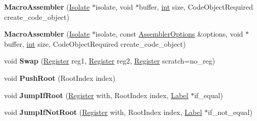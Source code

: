 \begin{DoxyCompactItemize}
\item 
\mbox{\label{classv8_1_1internal_1_1MacroAssembler_ace8e2b09ca4bac1b40d12d84416284f9}} 
{\bfseries Macro\+Assembler} (\mbox{\hyperlink{classv8_1_1internal_1_1Isolate}{Isolate}} $\ast$isolate, void $\ast$buffer, \mbox{\hyperlink{classint}{int}} size, Code\+Object\+Required create\+\_\+code\+\_\+object)
\item 
\mbox{\label{classv8_1_1internal_1_1MacroAssembler_a118ab3d38490e9a50ee0157274ac3dc9}} 
{\bfseries Macro\+Assembler} (\mbox{\hyperlink{classv8_1_1internal_1_1Isolate}{Isolate}} $\ast$isolate, const \mbox{\hyperlink{structv8_1_1internal_1_1AssemblerOptions}{Assembler\+Options}} \&options, void $\ast$buffer, \mbox{\hyperlink{classint}{int}} size, Code\+Object\+Required create\+\_\+code\+\_\+object)
\item 
\mbox{\label{classv8_1_1internal_1_1MacroAssembler_a184747cf20b5bc305a3e344e349aaa90}} 
void {\bfseries Swap} (\mbox{\hyperlink{classv8_1_1internal_1_1Register}{Register}} reg1, \mbox{\hyperlink{classv8_1_1internal_1_1Register}{Register}} reg2, \mbox{\hyperlink{classv8_1_1internal_1_1Register}{Register}} scratch=no\+\_\+reg)
\item 
\mbox{\label{classv8_1_1internal_1_1MacroAssembler_a91239e2f90525c993ce4dacef2b8219c}} 
void {\bfseries Push\+Root} (Root\+Index index)
\item 
\mbox{\label{classv8_1_1internal_1_1MacroAssembler_a026e7752dc80a8ac2c86242c713de128}} 
void {\bfseries Jump\+If\+Root} (\mbox{\hyperlink{classv8_1_1internal_1_1Register}{Register}} with, Root\+Index index, \mbox{\hyperlink{classv8_1_1internal_1_1Label}{Label}} $\ast$if\+\_\+equal)
\item 
\mbox{\label{classv8_1_1internal_1_1MacroAssembler_a2c433ea6b27ac33ad2b6ef6b1a751eb9}} 
void {\bfseries Jump\+If\+Not\+Root} (\mbox{\hyperlink{classv8_1_1internal_1_1Register}{Register}} with, Root\+Index index, \mbox{\hyperlink{classv8_1_1internal_1_1Label}{Label}} $\ast$if\+\_\+not\+\_\+equal)
\item 
\mbox{\label{classv8_1_1internal_1_1MacroAssembler_a4fd74303402ac28fb5ee591cbd10bd1f}} 

\end{DoxyCompactItemize}
